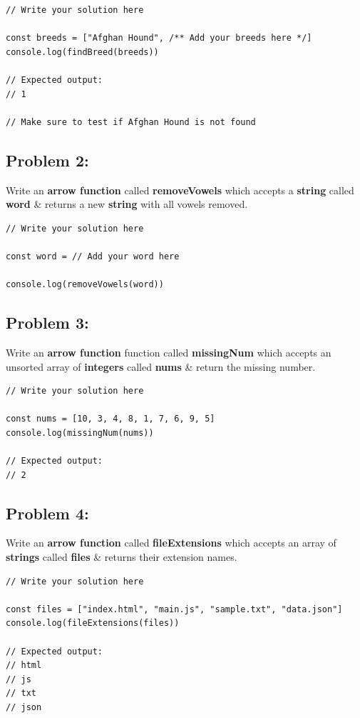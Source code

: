 \documentclass{article}
\begin{document}
\begin{verbatim}
// Write your solution here

const breeds = ["Afghan Hound", /** Add your breeds here */]
console.log(findBreed(breeds)) 

// Expected output:
// 1

// Make sure to test if Afghan Hound is not found
\end{verbatim}

\subsection*{Problem 2:} 
Write an \textbf{arrow function} called \textbf{removeVowels} which accepts a \textbf{string} called \textbf{word} \& returns a new \textbf{string} with all vowels removed.

\begin{verbatim}
// Write your solution here

const word = // Add your word here

console.log(removeVowels(word))
\end{verbatim}

\subsection*{Problem 3:} 
Write an \textbf{arrow function} function called \textbf{missingNum} which accepts an unsorted array of \textbf{integers} called \textbf{nums} \& return the missing number.

\begin{verbatim}
// Write your solution here

const nums = [10, 3, 4, 8, 1, 7, 6, 9, 5]
console.log(missingNum(nums))

// Expected output:
// 2
\end{verbatim}

\subsection*{Problem 4:}
Write an \textbf{arrow function} called \textbf{fileExtensions} which accepts an array of \textbf{strings} called \textbf{files} \& returns their extension names.

\begin{verbatim}
// Write your solution here

const files = ["index.html", "main.js", "sample.txt", "data.json"]
console.log(fileExtensions(files))

// Expected output:
// html
// js
// txt
// json
\end{verbatim}
\end{document}

